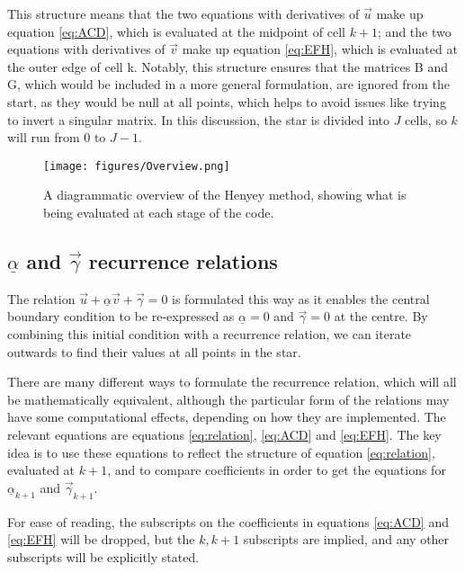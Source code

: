 \documentclass[11pt]{amsart}
\begin{document}
This structure means that the two equations with derivatives of $\vec{u}$ make up equation \ref{eq:ACD}, which is evaluated at the midpoint of cell $k+1$; and the two equations with derivatives of $\vec{v}$ make up equation \ref{eq:EFH}, which is evaluated at the outer edge of cell k.  Notably, this structure ensures that the matrices B and G, which would be included in a more general formulation, are ignored from the start, as they would be null at all points, which helps to avoid issues like trying to invert a singular matrix.  In this discussion, the star is divided into $J$ cells, so $k$ will run from $0$ to $J-1$. 


\begin{figure}
\begin{center}
\label{fig:overview}
\texttt{[image: figures/Overview.png]}
\caption{A diagrammatic overview of the Henyey method, showing what is being evaluated at each stage of the code.}
\end{center}
\end{figure}







\subsection{$\underline{\alpha}$ and $\vec{\gamma}$ recurrence relations}

The relation $\vec{u} + \underline{\alpha} \vec{v} + \vec{\gamma} = 0$ is formulated this way as it enables the central boundary condition to be re-expressed as $\underline{\alpha} = 0$ and $\vec{\gamma} = 0$ at the centre.  By combining this initial condition with a recurrence relation, we can iterate outwards to find their values at all points in the star.

There are many different ways to formulate the recurrence relation, which will all be mathematically equivalent, although the particular form of the relations may have some computational effects, depending on how they are implemented.  The relevant equations are equations \ref{eq:relation}, \ref{eq:ACD} and \ref{eq:EFH}.  The key idea is to use these equations to reflect the structure of equation \ref{eq:relation}, evaluated at $k+1$, and to compare coefficients in order to get the equations for $\underline{\alpha}_{k+1}$ and $\vec{\gamma}_{k+1}$.

For ease of reading, the subscripts on the coefficients in equations \ref{eq:ACD} and \ref{eq:EFH} will be dropped, but the $k,k+1$ subscripts are implied, and any other subscripts will be explicitly stated.
\end{document}
